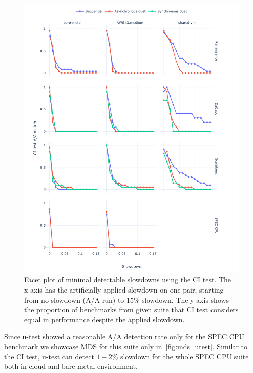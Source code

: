 \begin{figure}
	\centering
	\includegraphics[width=1\linewidth]{./figures/mds_citest.pdf}
	\caption{
		Facet plot of minimal detectable slowdowns using the CI test.
		The \mbox{x-axis} has the artificially applied slowdown on one pair, starting from no slowdown (A/A run) to $15\%$ slowdown.
		The \mbox{y-axis} shows the proportion of benchmarks from given suite that CI test considers equal in performance despite the applied slowdown.
	}
	\label{fig:mds_citest}
\end{figure}

Since \mbox{u-test} showed a reasonable A/A detection rate only for the SPEC CPU benchmark we showcase MDS for this suite only in~\cref{fig:mds_utest}.
Similar to the CI test, \mbox{u-test} can detect $1-2\%$ slowdown for the whole SPEC CPU suite both in cloud and \mbox{bare-metal} environment.

